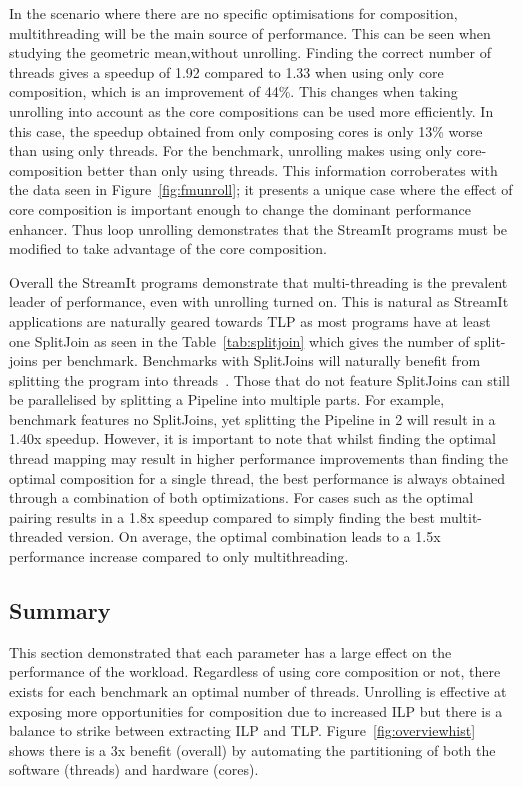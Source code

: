 In the scenario where there are no specific optimisations for composition, multithreading will be the main source of performance.
This can be seen when studying the geometric mean,without unrolling.
Finding the correct number of threads gives a speedup of 1.92 compared to 1.33 when using only core composition, which is an improvement of 44\%.
This changes when taking unrolling into account as the core compositions can be used more efficiently.
In this case, the speedup obtained from only composing cores is only 13\% worse than using only threads.
For the  benchmark, unrolling makes using only core-composition better than only using threads.
This information corroberates with the data seen in Figure~\ref{fig:fmunroll}; it presents a unique case where the effect of core composition is important enough to change the dominant performance enhancer.
Thus loop unrolling demonstrates that the StreamIt programs must be modified to take advantage of the core composition.

Overall the StreamIt programs demonstrate that multi-threading is the prevalent leader of performance, even with unrolling turned on.
This is natural as StreamIt applications are naturally geared towards TLP as most programs have at least one SplitJoin as seen in the Table~\ref{tab:splitjoin} which gives the number of split-joins per benchmark.
Benchmarks with SplitJoins will naturally benefit from splitting the program into threads~\cite{thiesStreamit2010}.
Those that do not feature SplitJoins can still be parallelised by splitting a Pipeline into multiple parts.
For example, benchmark  features no SplitJoins, yet splitting the Pipeline in 2 will result in a 1.40x speedup.
However, it is important to note that whilst finding the optimal thread mapping may result in higher performance improvements than finding the optimal composition for a single thread, the best performance is always obtained through a combination of both optimizations.
For cases such as  the optimal pairing results in a 1.8x speedup compared to simply finding the best multit-threaded version.
On average, the optimal combination leads to a 1.5x performance increase compared to only multithreading.

\subsection{Summary}
This section demonstrated that each parameter has a large effect on the performance of the workload.
Regardless of using core composition or not, there exists for each benchmark an optimal number of threads.
Unrolling is effective at exposing more opportunities for composition due to increased ILP but there is a balance to strike between extracting ILP and TLP.
Figure~\ref{fig:overviewhist} shows there is a 3x benefit (overall) by automating the partitioning of both the software (threads) and hardware (cores).


